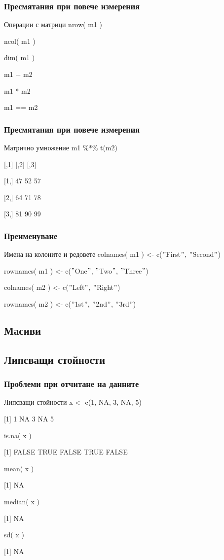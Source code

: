 \documentclass{beamer}
\begin{document}
\begin{frame}
\frametitle{Пресмятания при повече измерения}
\begin{block}{Операции с матрици}
nrow( m1 )

ncol( m1 )

dim( m1 )

m1 + m2
 
m1 * m2

m1 == m2
\end{block}
\end{frame}

\begin{frame}
\frametitle{Пресмятания при повече измерения}
\begin{block}{Матрично умножение}
m1 \%*\% t(m2)

     [,1] [,2] [,3]

[1,]   47   52   57

[2,]   64   71   78

[3,]   81   90   99
\end{block}
\end{frame}

\begin{frame}
\frametitle{Преименуване}
\begin{block}{Имена на колоните и редовете}
colnames( m1 ) <- c($"$First$"$, $"$Second$"$)

rownames( m1 ) <- c($"$One$"$, $"$Two$"$, $"$Three$"$)

colnames( m2 ) <- c($"$Left$"$, $"$Right$"$)

rownames( m2 ) <- c($"$1st$"$, $"$2nd$"$, $"$3rd$"$)
\end{block}
\end{frame}

\subsection{Масиви}

\subsection{Липсващи стойности}

\begin{frame}
\frametitle{Проблеми при отчитане на данните}
\begin{block}{Липсващи стойности}
x <- c(1, NA, 3, NA, 5)

[1]  1 NA  3 NA  5

is.na( x )

[1] FALSE  TRUE FALSE  TRUE FALSE

mean( x )

[1] NA

median( x )

[1] NA

sd( x )

[1] NA
\end{block}
\end{frame}
\end{document}
